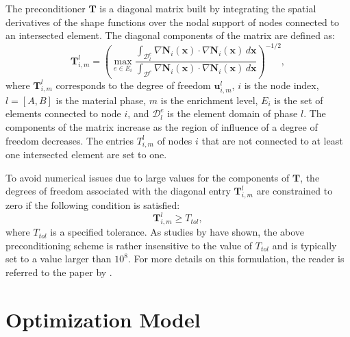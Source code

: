 The preconditioner $\pmb{T}$ is a diagonal matrix built by integrating the spatial derivatives of the shape functions over the nodal support of nodes connected to an intersected element. The diagonal components of the matrix are defined as:
%
\begin{equation}
\label{eqn:T-matrix}
	\pmb{T}_{i,m}^{l} = \left( \max_{e \in E_{i}} \frac { \int_{\mathcal{D}_l^e} \nabla \mathbf{N}_i(\mathbf{x}) \cdot
	\nabla
	\mathbf{N}_i(\mathbf{x}) \,d\mathbf{x}}{\int_{\mathcal{D}^e} \nabla \mathbf{N}_i(\mathbf{x}) \cdot \nabla
	\mathbf{N}_i(\mathbf{x}) \,d\mathbf{x}} \right)^{-1/2},
\end{equation}
%
where $\pmb{T}_{i,m}^{l}$ corresponds to the degree of freedom $\mathbf{u}_{i,m}^{l}$, $i$ is the node index, $l=[A,B]$ is the material phase, $m$ is the enrichment level, $E_{i}$ is the set of elements connected to node $i$, and $\mathcal{D}_l^e$ is the element domain of phase $l$. The components of the matrix increase as the region of influence of a degree of freedom decreases. The entries $T_{i,m}^{l}$ of nodes $i$ that are not connected to at least one intersected element are set to one.

To avoid numerical issues due to large values for the components of $\pmb{T}$, the degrees of freedom associated with the diagonal entry $\pmb{T}_{i,m}^{l}$ are constrained to zero if the following condition is satisfied:
%
\begin{equation}
\label{eqn:T-matrix-constraint}
	\pmb{T}_{i,m}^{l} \ge T_{tol},
\end{equation}
%
where $T_{tol}$ is a specified tolerance. As studies by \citet{LMD+:13} have shown, the above preconditioning scheme is rather insensitive to the value of $T_{tol}$ and is typically set to a value larger than $10^8$. For more details on this formulation, the reader is referred to the paper by \citet{LMD+:13}.


\section{Optimization Model}
\label{sec:optimization-model}

